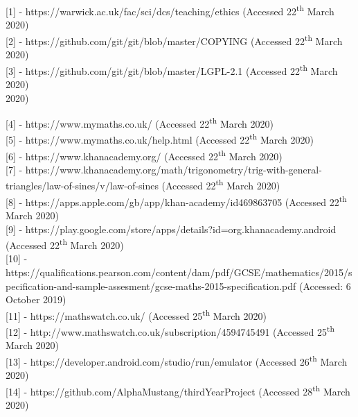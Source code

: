 \documentclass{article}
\begin{document}
[1] - https://warwick.ac.uk/fac/sci/dcs/teaching/ethics (Accessed 22\textsuperscript{th} March 2020) \\ 

[2] - https://github.com/git/git/blob/master/COPYING (Accessed 22\textsuperscript{th} March 2020) \\ 

[3] - https://github.com/git/git/blob/master/LGPL-2.1 (Accessed 22\textsuperscript{th} March 2020) \\  2020)

[4] - https://www.mymaths.co.uk/ (Accessed 22\textsuperscript{th} March 2020) \\ 

[5] - https://www.mymaths.co.uk/help.html (Accessed 22\textsuperscript{th} March 2020) \\

[6] - https://www.khanacademy.org/ (Accessed 22\textsuperscript{th} March 2020) \\

[7] - https://www.khanacademy.org/math/trigonometry/trig-with-general-triangles/law-of-sines/v/law-of-sines (Accessed 22\textsuperscript{th} March 2020) \\

[8] - https://apps.apple.com/gb/app/khan-academy/id469863705 (Accessed 22\textsuperscript{th} March 2020) \\ 

[9] - https://play.google.com/store/apps/details?id=org.khanacademy.android (Accessed 22\textsuperscript{th} March 2020) \\

[10] - https://qualifications.pearson.com/content/dam/pdf/GCSE/mathematics/2015/specification-and-sample-assesment/gcse-maths-2015-specification.pdf (Accessed: 6 October 2019) \\

[11] - https://mathswatch.co.uk/ (Accessed 25\textsuperscript{th} March 2020) \\

[12] - http://www.mathswatch.co.uk/subscription/4594745491 (Accessed 25\textsuperscript{th} March 2020) \\

[13] - https://developer.android.com/studio/run/emulator (Accessed 26\textsuperscript{th} March 2020) \\

[14] - https://github.com/AlphaMustang/thirdYearProject (Accessed 28\textsuperscript{th} March 2020) \\
\end{document}
